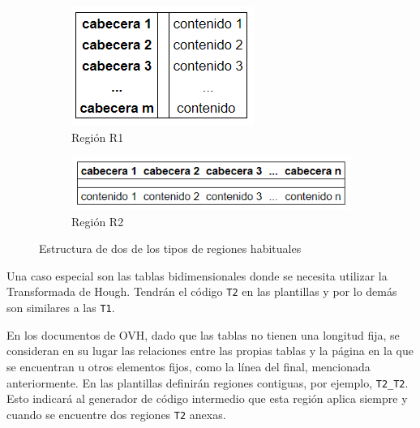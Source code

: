 \begin{figure}
    \centering
    \begin{subfigure}[b]{0.34\textwidth}
        \centering
        \includegraphics[width=\textwidth]{imaxes/g-analisis/region-r1}
        \caption{Región R1}
        \label{fig:region-r1}
    \end{subfigure}
    \hfill
    \begin{subfigure}[b]{0.65\textwidth}
        \centering
        \includegraphics[width=\textwidth]{imaxes/g-analisis/region-r2}
        \caption{Región R2}
        \label{fig:region-r2}
    \end{subfigure}
    \caption{Estructura de dos de los tipos de regiones habituales}
    \label{fig:tipos-de-regiones}
\end{figure}

Una caso especial son las tablas bidimensionales donde se necesita utilizar la Transformada de Hough. Tendrán el código \verb|T2| en las plantillas y por lo demás son similares a las \verb|T1|.

En los documentos de OVH, dado que las tablas no tienen una longitud fija, se consideran en su lugar las relaciones entre las propias tablas y la página en la que se encuentran u otros elementos fijos, como la línea del final, mencionada anteriormente. En las plantillas definirán regiones contiguas, por ejemplo, \verb|T2_T2|. Esto indicará al generador de código intermedio que esta región aplica siempre y cuando se encuentre dos regiones \verb|T2| anexas.

